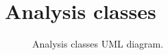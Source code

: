 \chapter{Analysis classes}

\begin{figure}[ht]
	\caption{Analysis classes UML diagram.}
	\label{fig:classes}
\end{figure}
